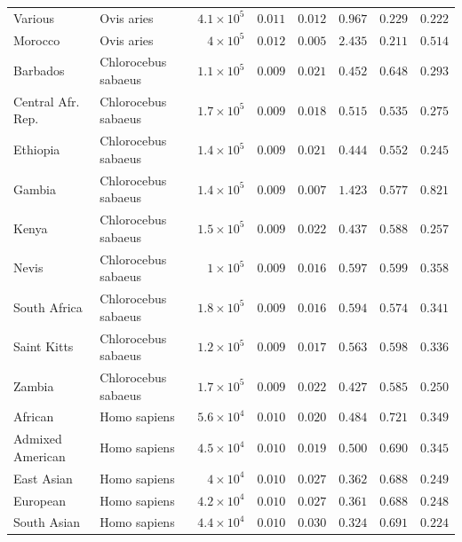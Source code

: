 \documentclass{article}
\begin{document}
\begin{center}
\begin{longtable*}{|l|l|r|r|r|r|r|r|}
            Various & Ovis aries & $4.1\times 10^{5}$ & $ 0.011$ & $ 0.012$ & $ 0.967$ & $ 0.229$ & $ 0.222$ \\
            Morocco & Ovis aries & $ 4\times 10^{5}$ & $ 0.012$ & $ 0.005$ & $ 2.435$ & $ 0.211$ & $ 0.514$ \\
             Barbados & Chlorocebus sabaeus & $1.1\times 10^{5}$ & $ 0.009$ & $ 0.021$ & $ 0.452$ & $ 0.648$ & $ 0.293$ \\
             Central Afr. Rep. & Chlorocebus sabaeus & $1.7\times 10^{5}$ & $ 0.009$ & $ 0.018$ & $ 0.515$ & $ 0.535$ & $ 0.275$ \\
             Ethiopia & Chlorocebus sabaeus & $1.4\times 10^{5}$ & $ 0.009$ & $ 0.021$ & $ 0.444$ & $ 0.552$ & $ 0.245$ \\
             Gambia & Chlorocebus sabaeus & $1.4\times 10^{5}$ & $ 0.009$ & $ 0.007$ & $ 1.423$ & $ 0.577$ & $ 0.821$ \\
             Kenya & Chlorocebus sabaeus & $1.5\times 10^{5}$ & $ 0.009$ & $ 0.022$ & $ 0.437$ & $ 0.588$ & $ 0.257$ \\
             Nevis & Chlorocebus sabaeus & $ 1\times 10^{5}$ & $ 0.009$ & $ 0.016$ & $ 0.597$ & $ 0.599$ & $ 0.358$ \\
             South Africa & Chlorocebus sabaeus & $1.8\times 10^{5}$ & $ 0.009$ & $ 0.016$ & $ 0.594$ & $ 0.574$ & $ 0.341$ \\
             Saint Kitts & Chlorocebus sabaeus & $1.2\times 10^{5}$ & $ 0.009$ & $ 0.017$ & $ 0.563$ & $ 0.598$ & $ 0.336$ \\
             Zambia & Chlorocebus sabaeus & $1.7\times 10^{5}$ & $ 0.009$ & $ 0.022$ & $ 0.427$ & $ 0.585$ & $ 0.250$ \\
            African & Homo sapiens & $5.6\times 10^{4}$ & $ 0.010$ & $ 0.020$ & $ 0.484$ & $ 0.721$ & $ 0.349$ \\
            Admixed American & Homo sapiens & $4.5\times 10^{4}$ & $ 0.010$ & $ 0.019$ & $ 0.500$ & $ 0.690$ & $ 0.345$ \\
            East Asian & Homo sapiens & $ 4\times 10^{4}$ & $ 0.010$ & $ 0.027$ & $ 0.362$ & $ 0.688$ & $ 0.249$ \\
            European & Homo sapiens & $4.2\times 10^{4}$ & $ 0.010$ & $ 0.027$ & $ 0.361$ & $ 0.688$ & $ 0.248$ \\
            South Asian & Homo sapiens & $4.4\times 10^{4}$ & $ 0.010$ & $ 0.030$ & $ 0.324$ & $ 0.691$ & $ 0.224$ \\

\end{longtable*}
\end{center}
\end{document}
